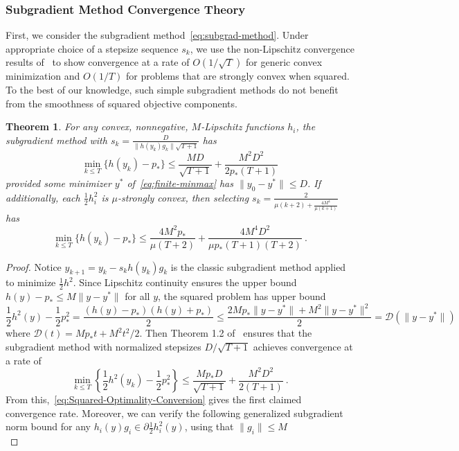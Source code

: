 \documentclass[sn-mathphys,Numbered]{sn-jnl}%
\newtheorem{theorem}{Theorem}%
\begin{document}
\begin{appendices}
{\subsubsection{Subgradient Method Convergence Theory}
First, we consider the subgradient method~\eqref{eq:subgrad-method}.
Under appropriate choice of a stepsize sequence $s_k$, we use the non-Lipschitz convergence results of~\cite{grimmer2019} to show convergence at a rate of $O(1/\sqrt{T})$ for generic convex minimization and $O(1/T)$ for problems that are strongly convex when squared. To the best of our knowledge, such simple subgradient methods do not benefit from the smoothness of squared objective components.
\begin{theorem}\label{thm:subgradient-convergence}
    For any convex, nonnegative, $M$-Lipschitz functions $h_i$, the subgradient method with $s_k=\frac{D}{\|h(y_k)g_k\|\sqrt{T+1}}$ has
    $$ \min_{k\leq T}\{h(y_k) - p_*\} \leq \frac{MD}{\sqrt{T+1}} + \frac{M^2D^2}{2p_*(T+1)} $$
    provided some minimizer $y^*$ of~\eqref{eq:finite-minmax} has $\|y_0-y^*\|\leq D$.
    If additionally, each $\frac{1}{2}h_i^2$ is $\mu$-strongly convex, then selecting $s_k = \frac{2}{\mu(k+2)+\frac{4M^4}{\mu(k+1)}}$ has
    $$ \min_{k\leq T}\{h(y_k) - p_*\} \leq \frac{4M^2p_*}{\mu(T+2)} + \frac{4M^4D^2}{\mu p_*(T+1)(T+2)} \ .$$
\end{theorem} 
\begin{proof}
Notice $y_{k+1} = y_k - s_k h(y_k)g_k$ is the classic subgradient method applied to minimize $\frac{1}{2}h^2$. 
Since Lipschitz continuity ensures the upper bound $h(y) - p_*\leq M\|y-y^*\|$ for all $y$, the squared problem has upper bound
\begin{equation}
    \frac{1}{2}h^2(y) - \frac{1}{2}p^2_* = \frac{(h(y)-p_*)(h(y)+p_*)}{2} \leq \frac{2Mp_*\|y-y^*\| + M^2\|y-y^*\|^2}{2}= \mathcal{D}(\|y-y^*\|) \label{eq:general-upper-bound}
\end{equation}
where $\mathcal{D}(t) = Mp_*t + M^2t^2/2$. Then Theorem 1.2 of~\cite{grimmer2019} ensures that the subgradient method with normalized stepsizes $D/\sqrt{T+1}$ achieves convergence at a rate of
$$ \min_{k\leq T}\left\{\frac{1}{2}h^2(y_k) - \frac{1}{2}p^2_*\right\} \leq \frac{Mp_*D}{\sqrt{T+1}} + \frac{M^2D^2}{2(T+1)} \ . $$
From this,~\eqref{eq:Squared-Optimality-Conversion} gives the first claimed convergence rate.
Moreover, we can verify the following generalized subgradient norm bound for any $h_i(y)g_i\in\partial \frac{1}{2}h_i^2(y)$, using that $\|g_i\|\leq M$
\begin{equation}

\end{equation}
\end{proof}}
\end{appendices}
\end{document}
